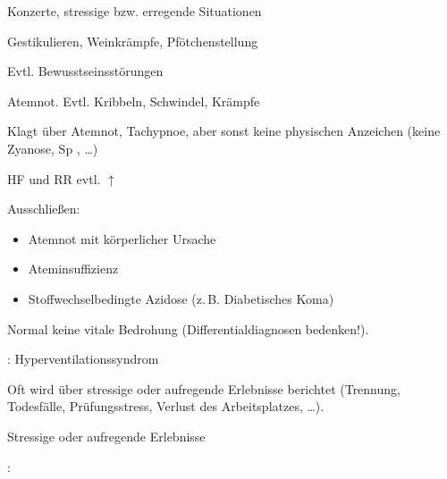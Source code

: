 {
\begin{ABCDESlide}
  \item[\ABCDE{1}] Konzerte, stressige bzw. erregende
  Situationen
  \item[\ABCDE{2}] Gestikulieren, Weinkrämpfe,
  Pfötchenstellung
  \item[\ABCDE{3}] Evtl. Bewusstseinsstörungen
  \item[\ABCDE{4}] Atemnot. Evtl. Kribbeln, Schwindel,
  Krämpfe
  \item[\ABCDE{B}] Klagt über Atemnot, Tachypnoe, aber sonst
  keine physischen Anzeichen (keine Zyanose, Sp
  \SymbolFindingNormal, \ldots)
  \item[\ABCDE{C}] HF und RR evtl. $\uparrow$
  \item[\ABCDE{E}] Ausschließen:
  \begin{itemize}
    \item Atemnot mit körperlicher Ursache
    \item Ateminsuffizienz
    \item Stoffwechselbedingte Azidose (z.\,B. Diabetisches Koma)
  \end{itemize}
  \item[\ABCDE{=}] Normal keine vitale Bedrohung
  (Differentialdiagnosen bedenken!).
\end{ABCDESlide}
}
{}
{}
{}

{{\TxSAMPLER}: Hyperventilationssyndrom}
{
\begin{SAMPLERText}
  \item[\SAMPLER{E}] Oft wird über stressige oder aufregende
  Erlebnisse berichtet (Trennung, Todesfälle, Prüfungsstress,
  Verlust des Arbeitsplatzes,
  \ldots).
\end{SAMPLERText}
}
{
\begin{SAMPLERSlide}
  \item[\SAMPLER{E}] Stressige oder aufregende
  Erlebnisse
\end{SAMPLERSlide}
}
{}
{}
{}



{ :
}{}




\ChapterEnd
